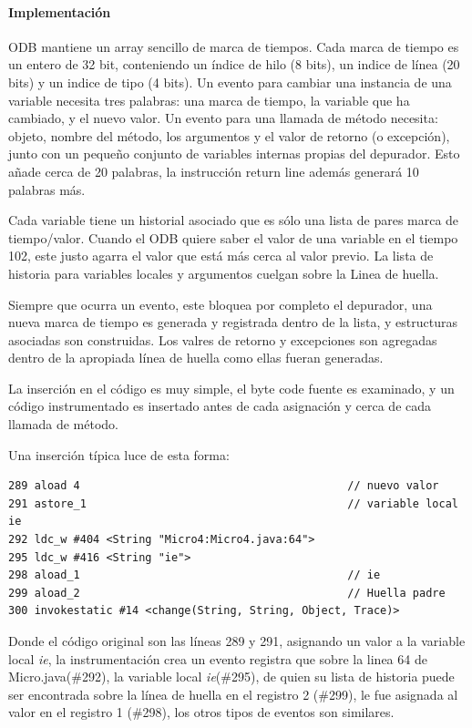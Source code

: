 \documentclass[12pt,legalpaper]{report}
\begin{document}
				\paragraph{Implementación}

ODB mantiene un array sencillo de marca de tiempos.  Cada marca de tiempo es un entero de 32 bit, conteniendo un índice de hilo (8 bits), un indice de línea (20 bits) y un indice de tipo (4 bits).  Un evento para cambiar una instancia de una variable necesita tres palabras: una marca de tiempo, la variable que ha cambiado, y el nuevo valor.  Un evento para una llamada de método necesita: objeto, nombre del método, los argumentos y el valor de retorno (o excepción), junto con un pequeño conjunto de variables internas propias del depurador.  Esto añade cerca de 20 palabras, la instrucción return line además generará 10 palabras más.

Cada variable tiene un historial asociado que es sólo una lista de pares marca de tiempo/valor. Cuando el ODB quiere saber el valor de una variable en el tiempo 102, este justo agarra el valor que está más cerca al valor previo.  La lista de historia para variables locales y argumentos cuelgan sobre la Linea de huella.

Siempre que ocurra un evento, este bloquea por completo el depurador, una nueva marca de tiempo es generada y registrada dentro de la lista, y estructuras asociadas son construidas.  Los valres de retorno y excepciones son agregadas dentro de la apropiada línea de huella como ellas fueran generadas.

La inserción en el código es muy simple, el byte code fuente es examinado, y un código instrumentado es insertado antes de cada asignación y cerca de cada llamada de método.

Una inserción típica luce de esta forma:

\begin{singlespace}
\begin{verbatim}
289 aload 4											// nuevo valor
291 astore_1										// variable local ie
292 ldc_w #404 <String "Micro4:Micro4.java:64">
295 ldc_w #416 <String "ie">
298 aload_1											// ie
299 aload_2											// Huella padre
300 invokestatic #14 <change(String, String, Object, Trace)>
\end{verbatim}
\end{singlespace}

Donde el código original son las líneas 289 y 291, asignando un valor a la variable local \textit{ie}, la instrumentación crea un evento registra que sobre la linea 64 de Micro.java(\#292), la variable local \textit{ie}(\#295), de quien su lista de historia puede ser encontrada sobre la línea de huella en el registro 2 (\#299), le fue asignada al valor en el registro 1 (\#298), los otros tipos de eventos son similares.
\end{document}
